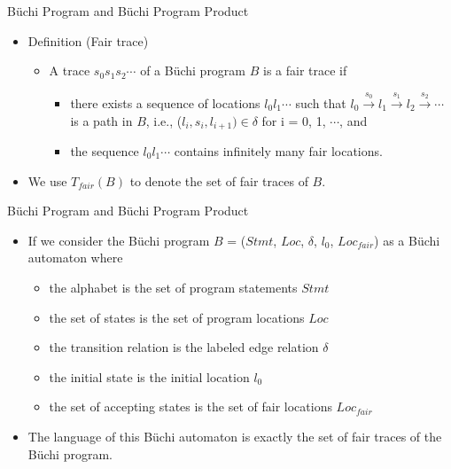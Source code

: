 \documentclass[12pt]{beamer}
\begin{document}
\begin{frame}{B\"uchi Program and B\"uchi Program Product}
  	\begin{itemize}
		\item Definition (Fair trace)
		\begin{itemize}
			\item A trace $s_{0}s_{1}s_{2}\cdots$ of a B\"uchi program $B$ is a fair trace if
			\begin{itemize}
				\item there exists a sequence of locations $l_{0}l_{1}\cdots$ such that $l_{0} \xrightarrow{s_{0}} l_{1} \xrightarrow{s_{1}} l_{2} \xrightarrow{s_{2}} \cdots$ is a path in $B$, i.e., ($l_{i},s_{i}, l_{i+1}) \in \delta$ for i = 0, 1, $\cdots$, and
				\item the sequence $l_{0}l_{1}\cdots$ contains infinitely many fair locations.
			\end{itemize}
		\end{itemize}
		\item We use $T_{fair}(B)$ to denote the set of fair traces of $B$.
  	\end{itemize}
\end{frame}

\begin{frame}{B\"uchi Program and B\"uchi Program Product}
  	\begin{itemize}
		\item If we consider the B\"uchi program $B$ = ($Stmt$, $Loc$, $\delta$, $l_{0}$, $Loc_{fair}$) as a B\"uchi automaton where
		\begin{itemize}
			\item the alphabet is the set of program statements $Stmt$
			\item the set of states is the set of program locations $Loc$
			\item the transition relation is the labeled edge relation $\delta$ 
			\item the initial state is the initial location $l_{0}$
			\item the set of accepting states is the set of fair locations $Loc_{fair}$
		\end{itemize}
		\item The language of this B\"uchi automaton is exactly the set of fair traces of the B\"uchi program.	
  	\end{itemize}
\end{frame}
\end{document}
